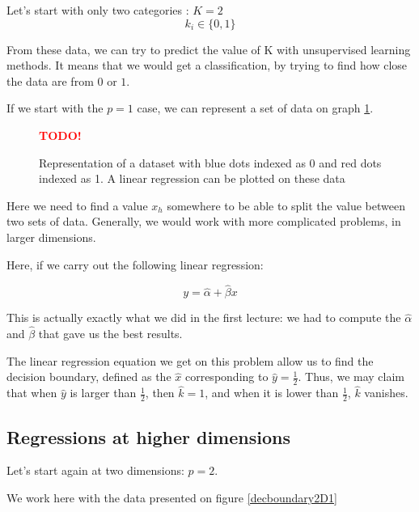 \documentclass[a4paper]{tufte-book}
\newcommand{\TODO}{\textcolor{red}{\bf TODO!}\xspace}
\newcommand{\half}{\frac{1}{2}}
\begin{document}
Let's start with only two categories : $K=2$
\begin{equation}
    k_i \in \{ 0, 1 \}
\end{equation}

From these data, we can try to predict the value of K with unsupervised learning
methods. It means that we would get a classification, by trying to find how
close the data are from $0$ or $1$.

If we start with the $p=1$ case, we can represent a set of data on graph
\ref{supvlearn6}.

\begin{figure}
    \TODO
    \caption{Representation of a dataset with blue dots indexed as 0 and red
        dots indexed as 1. A linear regression can be plotted on these data
    }
    \label{supvlearn6}
\end{figure}

Here we need to find a value $x_h$ somewhere to be able to split the value
between two sets of data. Generally, we would work with more complicated
problems, in larger dimensions.

Here, if we carry out the following linear regression:

\begin{equation}
    y = \hat \alpha + \hat \beta x
\end{equation}

This is actually exactly what we did in the first lecture: we had to compute
the $\hat \alpha$ and $\hat \beta$ that gave us the best results.

The linear regression equation we get on this problem allow us to find the
decision boundary, defined as the $\hat x$ corresponding to $\hat y = \half$.
Thus, we may claim that when $\hat y$ is larger than $\half$, then $\hat k =1$,
and when it is lower than $\half$, $\hat k$ vanishes.


\subsection{Regressions at higher dimensions}

Let's start again at two dimensions: $p=2$.

We work here with the data presented on figure \ref{decboundary2D1}
\end{document}
